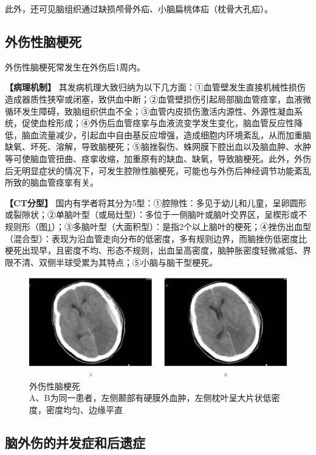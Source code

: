 此外，还可见脑组织通过缺损颅骨外疝、小脑扁桃体疝（枕骨大孔疝）。

\subsection{外伤性脑梗死}

外伤性脑梗死常发生在外伤后1周内。

\textbf{【病理机制】}
其发病机理大致归纳为以下几方面：①血管壁发生直接机械性损伤造成器质性狭窄或闭塞，致供血中断；②血管壁损伤引起局部脑血管痉挛，血液微循环发生障碍，致脑组织供血不全；③血管内皮损伤激活内源性、外源性凝血系统，促使血栓形成；④外伤后血管痉挛与血液流变学发生变化，脑血管反应性降低，脑血流量减少，引起血中自由基反应增强，造成细胞内环境紊乱，从而加重脑缺氧、坏死、溶解，导致脑梗死；⑤脑挫裂伤、蛛网膜下腔出血以及脑血肿、水肿等可使脑血管扭曲、痉挛收缩，加重原有的缺血、缺氧，导致脑梗死。此外，外伤后无明显症状的情况下，可发生腔隙性脑梗死，可能也与外伤后神经调节功能紊乱所致的脑血管痉挛有关。

\textbf{【CT分型】}
国内有学者将其分为5型：①腔隙性：多见于幼儿和儿童，呈卵圆形或裂隙状；②单脑叶型（或局灶型）：多位于一侧脑叶或脑叶交界区，呈楔形或不规则形（图\ref{fig2-36}）；③多脑叶型（大面积型）：是指2个以上脑叶的梗死；④挫伤出血型（混合型）：表现为沿血管走向分布的低密度，多有规则边界，而脑挫伤低密度比梗死出现早，且密度不均、形态不规则，出血呈高密度，脑肿胀密度轻微减低、界限不清、双侧半球受累为其特点；⑤小脑与脑干型梗死。

\begin{figure}[!htbp]
 \centering
 \includegraphics[width=.7\textwidth,height=\textheight,keepaspectratio]{./images/Image00057.jpg}
 \captionsetup{justification=centering}
 \caption{外伤性脑梗死\\{\small A、B为同一患者，左侧颞部有硬膜外血肿，左侧枕叶呈大片状低密度，密度均匀、边缘平直}}
 \label{fig2-36}
  \end{figure} 

\subsection{脑外伤的并发症和后遗症}


